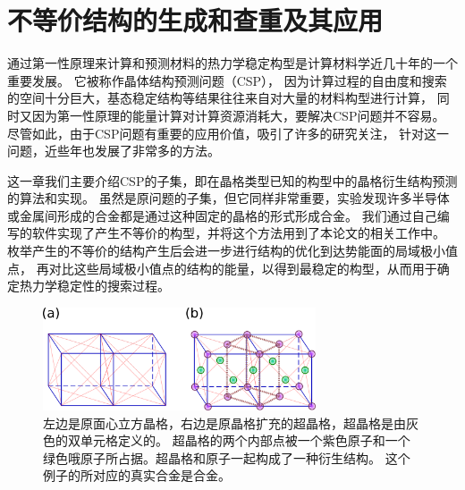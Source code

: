 \chapter{不等价结构的生成和查重及其应用}\label{chapter:unique}

通过第一性原理来计算和预测材料的热力学稳定构型是计算材料学近几十年的一个重要发展。
它被称作晶体结构预测问题（CSP），
因为计算过程的自由度和搜索的空间十分巨大，基态稳定结构等结果往往来自对大量的材料构型进行计算，
同时又因为第一性原理的能量计算对计算资源消耗大，要解决CSP问题并不容易。
尽管如此，由于CSP问题有重要的应用价值，吸引了许多的研究关注，
针对这一问题，近些年也发展了非常多的方法。

这一章我们主要介绍CSP的子集，即在晶格类型已知的构型中的晶格衍生结构预测的算法和实现。
虽然是原问题的子集，但它同样非常重要，实验发现许多半导体或金属间形成的合金都是通过这种固定的晶格的形式形成合金。
我们通过自己编写的软件实现了产生不等价的构型，并将这个方法用到了本论文的相关工作中。
枚举产生的不等价的结构产生后会进一步进行结构的优化到达势能面的局域极小值点，
再对比这些局域极小值点的结构的能量，以得到最稳定的构型，从而用于确定热力学稳定性的搜索过程。

\begin{figure}
  \includegraphics[width=0.72\textwidth]{figs/ch4_fcc_superlattice.png}
  \centering
  \caption{左边是原面心立方晶格，右边是原晶格扩充的超晶格，超晶格是由灰色的双单元格定义的。
  超晶格的两个内部点被一个紫色原子和一个绿色哦原子所占据。超晶格和原子一起构成了一种衍生结构。
  这个例子的所对应的真实合金是合金。}
  \label{fig:ch4_fcc_superlattice}
\end{figure}

